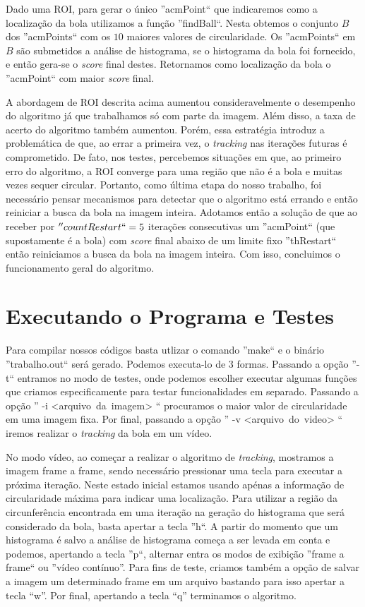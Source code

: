 \documentclass[11pt,a4paper]{article}
\begin{document}
 Dado uma ROI, para gerar o único ''acmPoint`` que indicaremos como a localização da bola utilizamos a função ''findBall``. Nesta obtemos o conjunto $B$ dos ''acmPoints`` com os $10$ maiores valores de circularidade. Os ''acmPoints`` em $B$ são submetidos a análise de histograma, se o histograma da bola foi fornecido, e então gera-se o \textit{score} final destes. Retornamos como localização da bola o ''acmPoint`` com maior \textit{score} final.

 A abordagem de ROI descrita acima aumentou consideravelmente o desempenho do algoritmo já que trabalhamos só com parte da imagem. Além disso, a taxa de acerto do algoritmo também aumentou. Porém, essa estratégia introduz a problemática de que, ao errar a primeira vez, o \textit{tracking} nas iterações futuras é comprometido. De fato, nos testes, percebemos situações em que, ao primeiro erro do algoritmo, a ROI converge para uma região que não é a bola e muitas vezes sequer circular. Portanto, como última etapa do nosso trabalho, foi necessário pensar mecanismos para detectar que o algoritmo está errando e então reiniciar a busca da bola na imagem inteira. Adotamos então a solução de que ao receber por $''countRestart``=5$ iterações consecutivas um ''acmPoint`` (que supostamente é a bola) com \textit{score} final abaixo de um limite fixo ''thRestart`` então reiniciamos a busca da bola na imagem inteira. Com isso, concluimos o funcionamento geral do algoritmo.

\section{Executando o Programa e Testes}

 Para compilar nossos códigos basta utlizar o comando ''make`` e o binário ''trabalho.out`` será gerado. Podemos executa-lo de $3$ formas. Passando a opção ''-t`` entramos no modo de testes, onde podemos escolher executar algumas funções que criamos especificamente para testar funcionalidades em separado. Passando a opção '' -i <arquivo~da~imagem> `` procuramos o maior valor de circularidade em uma imagem fixa. Por final, passando a opção '' -v <arquivo~do~video> `` iremos realizar o \textit{tracking} da bola em um vídeo.

 No modo vídeo, ao começar a realizar o algoritmo de \textit{tracking}, mostramos a imagem frame a frame, sendo necessário pressionar uma tecla para executar a próxima iteração. Neste estado inicial estamos usando apénas a informação de circularidade máxima para indicar uma localização. Para utilizar a região da circunferência encontrada em uma iteração na geração do histograma que será considerado da bola, basta apertar a tecla ''h``. A partir do momento que um histograma é salvo a análise de histograma começa a ser levada em conta e podemos, apertando a tecla ''p``, alternar entra os modos de exibição ''frame a frame`` ou ''vídeo contínuo''. Para fins de teste, criamos também a opção de salvar a imagem um determinado frame em um arquivo bastando para isso apertar a tecla ``w''. Por final, apertando a tecla ``q'' terminamos o algoritmo.
\end{document}
